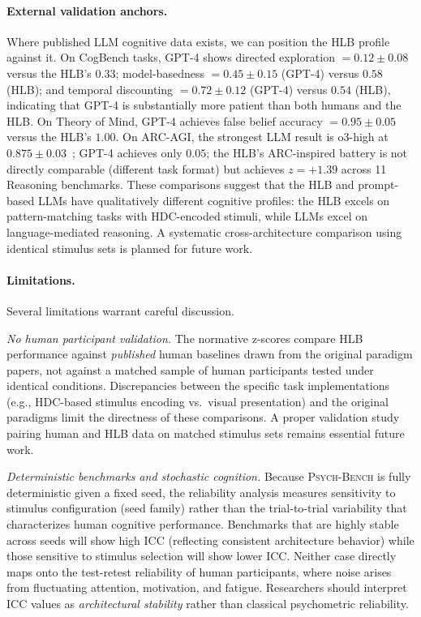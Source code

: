 \documentclass[11pt,letterpaper]{article}
\newcommand{\psychbench}{\textsc{Psych-Bench}}
\newcommand{\hlb}{\textsc{HLB}}
\begin{document}
\paragraph{External validation anchors.} Where published LLM cognitive data exists, we can position the \hlb{} profile against it. On CogBench tasks, GPT-4 shows directed exploration $= 0.12 \pm 0.08$~\citep{codaforno2024cogbench} versus the \hlb{}'s $0.33$; model-basedness $= 0.45 \pm 0.15$ (GPT-4) versus $0.58$ (\hlb{}); and temporal discounting $= 0.72 \pm 0.12$ (GPT-4) versus $0.54$ (\hlb{}), indicating that GPT-4 is substantially more patient than both humans and the \hlb{}. On Theory of Mind, GPT-4 achieves false belief accuracy $= 0.95 \pm 0.05$~\citep{kosinski2023theory} versus the \hlb{}'s $1.00$. On ARC-AGI, the strongest LLM result is o3-high at $0.875 \pm 0.03$~\citep{chollet2019measure}; GPT-4 achieves only $0.05$; the \hlb{}'s ARC-inspired battery is not directly comparable (different task format) but achieves $z = +1.39$ across 11 Reasoning benchmarks. These comparisons suggest that the \hlb{} and prompt-based LLMs have qualitatively different cognitive profiles: the \hlb{} excels on pattern-matching tasks with HDC-encoded stimuli, while LLMs excel on language-mediated reasoning. A systematic cross-architecture comparison using identical stimulus sets is planned for future work.

\paragraph{Limitations.} Several limitations warrant careful discussion.

\emph{No human participant validation.} The normative z-scores compare \hlb{} performance against \emph{published} human baselines drawn from the original paradigm papers, not against a matched sample of human participants tested under identical conditions. Discrepancies between the specific task implementations (e.g., HDC-based stimulus encoding vs.\ visual presentation) and the original paradigms limit the directness of these comparisons. A proper validation study pairing human and \hlb{} data on matched stimulus sets remains essential future work.

\emph{Deterministic benchmarks and stochastic cognition.} Because \psychbench{} is fully deterministic given a fixed seed, the reliability analysis measures sensitivity to stimulus configuration (seed family) rather than the trial-to-trial variability that characterizes human cognitive performance. Benchmarks that are highly stable across seeds will show high ICC (reflecting consistent architecture behavior) while those sensitive to stimulus selection will show lower ICC. Neither case directly maps onto the test-retest reliability of human participants, where noise arises from fluctuating attention, motivation, and fatigue. Researchers should interpret ICC values as \emph{architectural stability} rather than classical psychometric reliability.
\end{document}
